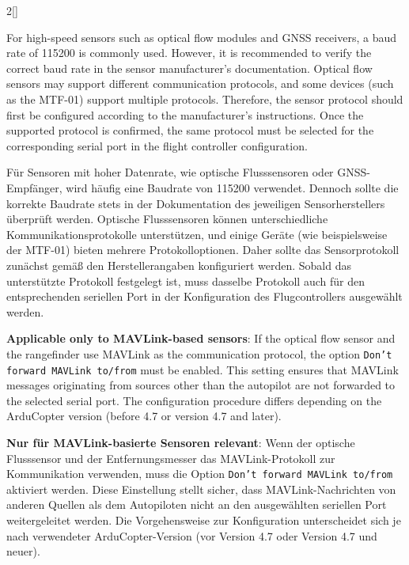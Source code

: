 \begin{paracol}{2}[]
\coleng

For high-speed sensors such as optical flow modules and GNSS receivers, a baud rate of 115200 is commonly used. However, it is recommended to verify the correct baud rate in the sensor manufacturer’s documentation. Optical flow sensors may support different communication protocols, and some devices (such as the MTF-01) support multiple protocols. Therefore, the sensor protocol should first be configured according to the manufacturer’s instructions. Once the supported protocol is confirmed, the same protocol must be selected for the corresponding serial port in the flight controller configuration.

\colger

Für Sensoren mit hoher Datenrate, wie optische Flusssensoren oder GNSS-Empfänger, wird häufig eine Baudrate von 115200 verwendet. Dennoch sollte die korrekte Baudrate stets in der Dokumentation des jeweiligen Sensorherstellers überprüft werden. Optische Flusssensoren können unterschiedliche Kommunikationsprotokolle unterstützen, und einige Geräte (wie beispielsweise der MTF-01) bieten mehrere Protokolloptionen. Daher sollte das Sensorprotokoll zunächst gemäß den Herstellerangaben konfiguriert werden. Sobald das unterstützte Protokoll festgelegt ist, muss dasselbe Protokoll auch für den entsprechenden seriellen Port in der Konfiguration des Flugcontrollers ausgewählt werden.

\coleng

\textbf{Applicable only to MAVLink-based sensors}: If the optical flow sensor and the rangefinder use MAVLink as the communication protocol, the option \texttt{Don’t forward MAVLink to/from} must be enabled. This setting ensures that MAVLink messages originating from sources other than the autopilot are not forwarded to the selected serial port. The configuration procedure differs depending on the ArduCopter version (before 4.7 or version 4.7 and later).

\colger

\textbf{Nur für MAVLink-basierte Sensoren relevant}: Wenn der optische Flusssensor und der Entfernungsmesser das MAVLink-Protokoll zur Kommunikation verwenden, muss die Option \texttt{Don’t forward MAVLink to/from} aktiviert werden. Diese Einstellung stellt sicher, dass MAVLink-Nachrichten von anderen Quellen als dem Autopiloten nicht an den ausgewählten seriellen Port weitergeleitet werden. Die Vorgehensweise zur Konfiguration unterscheidet sich je nach verwendeter ArduCopter-Version (vor Version 4.7 oder Version 4.7 und neuer).


\end{paracol}
